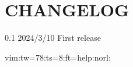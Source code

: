 
\section{CHANGELOG}

\begin{verbatim*}
0.1		2024/3/10
		First release

vim:tw=78:ts=8:ft=help:norl:
\end{verbatim*}

